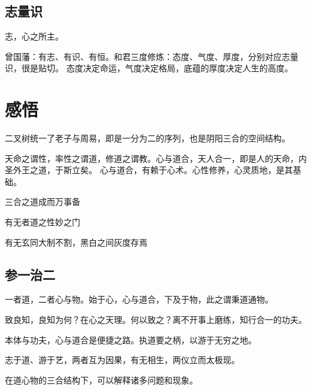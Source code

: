 \subsection{志量识}

志，心之所主。

曾国藩：有志、有识、有恒。和君三度修炼：态度、气度、厚度，分别对应志量识，很是贴切。
态度决定命运，气度决定格局，底蕴的厚度决定人生的高度。

\section{感悟}

二叉树统一了老子与周易，即是一分为二的序列，也是阴阳三合的空间结构。

天命之谓性，率性之谓道，修道之谓教。心与道合，天人合一，即是人的天命，内圣外王之道，于斯立矣。
心与道合，有赖于心术。心性修养，心灵质地，是其基础。

三合之道成而万事备

有无者道之性妙之门

有无玄同大制不割，黑白之间灰度存焉

\subsection{参一治二}

一者道，二者心与物。始于心，心与道合，下及于物，此之谓秉道通物。

致良知，良知为何？在心之天理。何以致之？离不开事上磨练，知行合一的功夫。

本体与功夫，心与道合是便捷之路。执道要之柄，以游于无穷之地。

志于道、游于艺，两者互为因果，有无相生，两仪立而太极现。

在道心物的三合结构下，可以解释诸多问题和现象。
